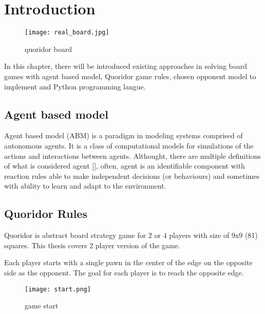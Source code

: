 \chapter{Introduction}\label{chap:1}

\begin{wrapfigure}{R}{0.4\textwidth}
  \vspace*{-2.80cm}
  \centering
  \texttt{[image: real\_board.jpg]}
  \vspace*{-0.60cm}
  \caption{quoridor board}
  \label{fig:quoridor_board}
  \vspace*{-1.00cm}
\end{wrapfigure}

  In this chapter, there will be introduced existing approaches in solving
board games with agent based model, Quoridor game rules, chosen opponent model
to implement and Python programming langue.
\section{Agent based model}
Agent based model (ABM) is a paradigm in modeling systems comprised of autonomous
agents. It is a class of computational models for simulations of the actions
and interactions between agents. Althought, there are multiple definitions
of what is considered agent [\cite{abm}], often, agent is an identifiable
component with reaction rules able to make independent decisions (or
behaviours) and sometimes with ability to learn and adapt to the environment.

\section{Quoridor Rules}

Quoridor is abstract board strategy game for 2 or 4 players with size of
9x9 (81) squares. This thesis covers 2 player version of the game.

Each player starts with a single pawn in the center of the edge on the
opposite side as the opponent.
The goal for each player is to reach the opposite edge.

\begin{wrapfigure}{L}{0.35\textwidth}
  \vspace*{-0.20cm}
  \centering
  \texttt{[image: start.png]}
  \vspace*{-1.20cm}
  \caption{game start}
  \label{fig:game_start}
  \vspace*{-0.40cm}
\end{wrapfigure}

